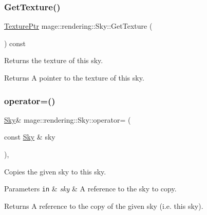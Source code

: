 \subsubsection{\texorpdfstring{Get\+Texture()}{GetTexture()}}
{\footnotesize\ttfamily \mbox{\hyperlink{namespacemage_1_1rendering_a6f3ae54f825328465b0cdde0f0de4a36}{Texture\+Ptr}} mage\+::rendering\+::\+Sky\+::\+Get\+Texture (\begin{DoxyParamCaption}{ }\end{DoxyParamCaption}) const\hspace{0.3cm}{\ttfamily [noexcept]}}

Returns the texture of this sky.

\begin{DoxyReturn}{Returns}
A pointer to the texture of this sky. 
\end{DoxyReturn}
\mbox{\label{classmage_1_1rendering_1_1_sky_a9654c598bd30fee1b0892b0abf7b7c96}} 
\subsubsection{\texorpdfstring{operator=()}{operator=()}\hspace{0.1cm}{\footnotesize\ttfamily [1/2]}}
{\footnotesize\ttfamily \mbox{\hyperlink{classmage_1_1rendering_1_1_sky}{Sky}}\& mage\+::rendering\+::\+Sky\+::operator= (\begin{DoxyParamCaption}\item[{const \mbox{\hyperlink{classmage_1_1rendering_1_1_sky}{Sky}} \&}]{sky }\end{DoxyParamCaption})\hspace{0.3cm}{\ttfamily [default]}, {\ttfamily [noexcept]}}

Copies the given sky to this sky.


\begin{DoxyParams}[1]{Parameters}
\mbox{\tt in}  & {\em sky} & A reference to the sky to copy. \\
\hline
\end{DoxyParams}
\begin{DoxyReturn}{Returns}
A reference to the copy of the given sky (i.\+e. this sky). 
\end{DoxyReturn}
\mbox{\label{classmage_1_1rendering_1_1_sky_a01b1145f77fdab81e7dce93f6a524b45}} 
